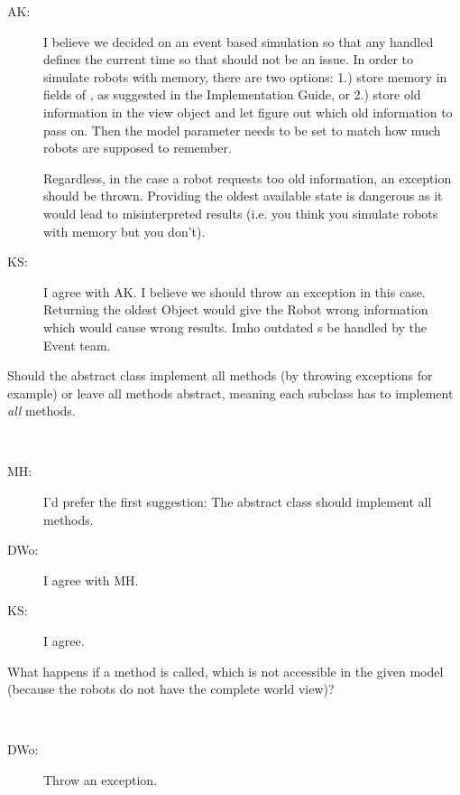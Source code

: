 \begin{appendix}
\begin{resolution}
\begin{description}
	\item [AK:] I believe we decided on an event based simulation so that any handled  defines the current time so that should not be an issue. In order to simulate robots with memory, there are two options: 1.) store memory in fields of , as suggested in the Implementation Guide, or 2.) store old information in the view object and let  figure out which old information to pass on. Then the model parameter  needs to be set to match how much robots are supposed to remember.\par
	Regardless, in the case a robot requests too old information, an exception should be thrown. Providing the oldest available state is dangerous as it would lead to misinterpreted results (i.e. you think you simulate robots with memory but you don't).
	
	\item [KS:] I agree with AK. I believe we should throw an exception in this case. Returning the oldest Object would give the Robot wrong information which would cause wrong results. Imho outdated s  be handled by the Event team.
\end{description}	
\end{resolution}

\begin{designQuestion}
	Should the abstract  class implement all methods (by throwing exceptions for example) or leave all methods abstract, meaning each subclass has to implement \emph{all} methods.
\end{designQuestion}
\begin{resolution}~
\begin{description}
	\item [MH:] I'd prefer the first suggestion: The abstract  class should implement all methods.
	
	\item [DWo:] I agree with MH.
	
	\item [KS:] I agree.
\end{description}
\end{resolution}

\begin{designQuestion}
	What happens if a  method is called, which is not accessible in the given model (because the robots do not have the complete world view)?
\end{designQuestion}
\begin{resolution}~
\begin{description}
	\item [DWo:] Throw an exception.
	

\end{description}
\end{resolution}
\end{appendix}
